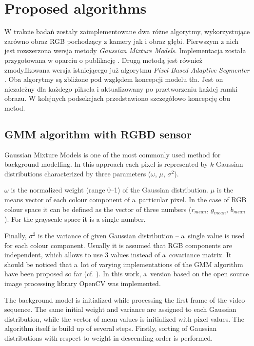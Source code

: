 \documentclass[b5paper,10pt,twoside]{article}
\begin{document}
{\section{Proposed algorithms}

W trakcie badań zostały zaimplementowane dwa różne algorytmy, wykorzystujące zarówno obraz RGB pochodzący z kamery jak i obraz głębi. Pierwszym z nich jest rozszerzona wersja metody \textit{Gaussian Mixture Models}. Implementacja została przygotowana w oparciu o publikację \cite{}. Drugą metodą jest również zmodyfikowana wersja istniejącego już algorytmu \textit{Pixel Based Adaptive Segmenter} \cite{}. Oba algorytmy są zbliżone pod względem koncepcji modelu tła. Jest on niezależny dla każdego piksela i aktualizowany po przetworzeniu każdej ramki obrazu. W kolejnych podsekcjach przedstawiono szczegółowo koncepcję obu metod. 

\subsection{GMM algorithm with RGBD sensor}
\label{subsec:gmm_rgbd}

Gaussian Mixture Models is one of the most commonly used method for background modelling. 
In this approach each pixel is represented by $k$ Gaussian distributions characterized by three parameters ($\omega$, $\mu$, $\sigma^2$). 

$\omega$ is the normalized weight (range 0--1) of the Gaussian distribution.
$\mu$ is the means vector of each colour component of a~particular pixel. 
In the case of RGB colour space it can be defined as the vector of three numbers ($r_{mean}$, $g_{mean}$, $b_{mean}$).
For the grayscale space it is a single number. 

Finally, $\sigma^2$ is the variance of given Gaussian distribution -- a~single value is used for each colour component.
Usually it is assumed that RGB components are independent, which allows to use 3 values instead of a~covariance matrix.
It should be noticed that a~lot of varying implementations of the GMM algorithm have been proposed so far (cf. \cite{Bouwmans_2008}). 
In this work, a~version based on the open source image processing library OpenCV was implemented. 




The background model is initialized while processing the first frame of the video sequence. 
The same initial weight and variance are assigned to each Gaussian distribution, while the vector of mean values is initialized with pixel values. 
The algorithm itself is build up of several steps. 
Firstly, sorting of Gaussian distributions with respect to weight in descending order is performed. 

}
\end{document}

